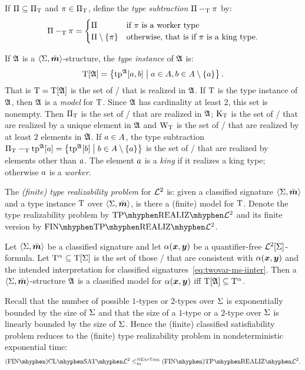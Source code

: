 If $\Pi \subseteq \Pi_{\mathrm{T}}$ and $\pi \in \Pi_{\mathrm{T}}$, define the
\emph{type subtraction} $\Pi -_{\mathrm{T}} \pi$ by:
\[
  \Pi -_{\mathrm{T}} \pi = \begin{cases}
    \Pi &\text{if } \pi \text{ is a worker type} \\
    \Pi \setminus \left\{\pi\right\} &\text{otherwise, that is if } \pi \text{ is a king
    type.}
  \end{cases}
\]

If $\mathfrak{A}$ is a $\left\langle \mathrm{\Sigma},\bar{\bm{m}} \right\rangle$-structure, the \emph{type instance} of $\mathfrak{A}$
is:
\[
  \mathrm{T}[\mathfrak{A}] = \left\{\operatorname{tp}^{\mathfrak{A}}[a,b]\mathrel{}\middle|\mathrel{}
    a \in A, b \in A \setminus\left\{a\right\}\right\}.
\]
That is $\mathrm{T} = \mathrm{T}[\mathfrak{A}]$ is the set of \twotypes/ that is realized in $\mathfrak{A}$.
If $\mathrm{T}$ is the type instance of $\mathfrak{A}$, then $\mathfrak{A}$ is a \emph{model} for
$\mathrm{T}$.
Since $\mathfrak{A}$ has cardinality at least $2$, this set is nonempty.
Then $\Pi_{\mathrm{T}}$ is the set of \onetypes/ that are realized in $\mathfrak{A}$;
$\mathrm{K}_{\mathrm{T}}$ is the set of \onetypes/ that are realized by a unique element in
$\mathfrak{A}$ and $\mathrm{W}_{\mathrm{T}}$ is the set of \onetypes/ that are realized by at least $2$
elements in $\mathfrak{A}$.
If $a \in A$, the type subtraction $\Pi_{\mathrm{T}} -_{\mathrm{T}} \operatorname{tp}^{\mathfrak{A}}[a] =
\left\{\operatorname{tp}^{\mathfrak{A}}[b]\mathrel{}\middle|\mathrel{}b \in A \setminus \left\{a\right\}\right\}$ is the set of \onetypes/ that
are realized by elements other than $a$.
The element $a$ is a \emph{king} if it realizes a king type; otherwise $a$
is a \emph{worker}.

\begin{definition}
The \emph{(finite) type realizability problem} for $\mathcal{L}^{2}$ is: given a
classified signature $\left\langle \mathrm{\Sigma},\bar{\bm{m}} \right\rangle$ and a type instance $\mathrm{T}$ over
$\left\langle \mathrm{\Sigma},\bar{\bm{m}} \right\rangle$, is there a (finite) model for $\mathrm{T}$.
Denote the type realizability problem by $\Real{\vFo2}$ and its finite version
by $\FinReal{\vFo2}$.
\end{definition}

\begin{remark}\label{rem:red-sat-to-real}
Let $\left\langle \mathrm{\Sigma},\bar{\bm{m}} \right\rangle$ be a classified signature and let $\alpha(\bm{x},\bm{y})$ be a
quantifier-free $\mathcal{L}^{2}[\mathrm{\Sigma}]$-formula.
Let $\mathrm{T}^\alpha \subseteq \mathrm{T}[\mathrm{\Sigma}]$ is the set of those \twotypes/ that are
consistent with $\alpha(\bm{x},\bm{y})$ and the intended interpretation
for classified signatures~\cref{eq:twovar-ms-iinter}.
Then a $\left\langle \mathrm{\Sigma},\bar{\bm{m}} \right\rangle$-structure $\mathfrak{A}$ is a classified model for
$\alpha(\bm{x},\bm{y})$ iff $\mathrm{T}[\mathfrak{A}] \subseteq \mathrm{T}^\alpha$.

Recall that the number of possible $1$-types or $2$-types over $\mathrm{\Sigma}$ is
exponentially bounded by the size of $\mathrm{\Sigma}$ and that the size of a $1$-type or
a $2$-type over $\mathrm{\Sigma}$ is linearly bounded by the size of $\mathrm{\Sigma}$.
Hence the (finite) classified satisfiability problem reduces to the
(finite) type realizability problem in nondeterministic exponential time:
\[
  \FinAClSat{\vFo2} \red\cNExpTime \FinAReal{\vFo2}.
\]
\end{remark}


